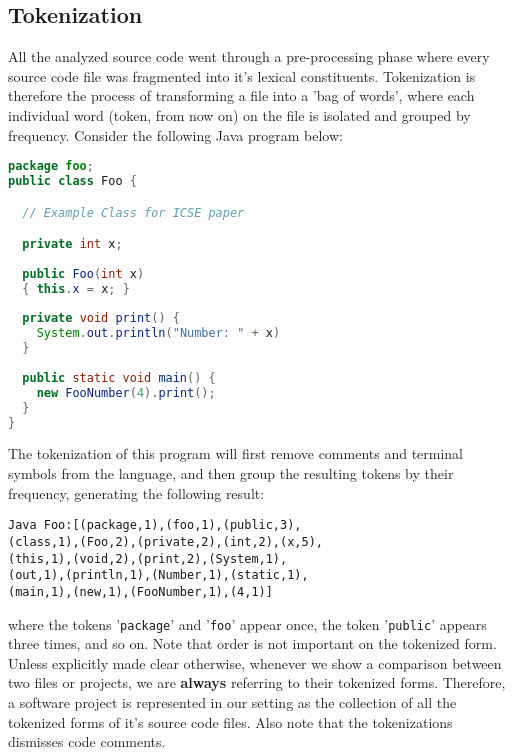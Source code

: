 
\subsection{Tokenization}

All the analyzed source code went through a pre-processing phase where every source code file was fragmented into it's lexical constituents. Tokenization is therefore the process of transforming a file into a 'bag of words', where each individual word (token, from now on) on the file is isolated and grouped by frequency. Consider the following Java program below:

\begin{lstlisting}[language=Java,label={lst:java-example},caption={Java Foo.}]
package foo;
public class Foo {

  // Example Class for ICSE paper

  private int x;
  
  public Foo(int x)
  { this.x = x; }
  
  private void print() {
    System.out.println("Number: " + x)
  }
  
  public static void main() {
    new FooNumber(4).print();
  }
}
\end{lstlisting}

The tokenization of this program will first remove comments and terminal symbols from the language, and then group the resulting tokens by their frequency, generating the following result:

\begin{lstlisting}[numbers=none]
Java Foo:[(package,1),(foo,1),(public,3),
(class,1),(Foo,2),(private,2),(int,2),(x,5),
(this,1),(void,2),(print,2),(System,1),
(out,1),(println,1),(Number,1),(static,1),
(main,1),(new,1),(FooNumber,1),(4,1)]
\end{lstlisting}

\noindent
where the tokens '\texttt{package}' and '\texttt{foo}' appear once, the token '\texttt{public}' appears three times, and so on. Note that order is not important on the tokenized form. Unless explicitly made clear otherwise, whenever we show a comparison between two files or projects, we are \textbf{always} referring to their tokenized forms. Therefore, a software project is represented in our setting as the collection of all the tokenized forms of it's source code files. Also note that the tokenizations dismisses code comments.

